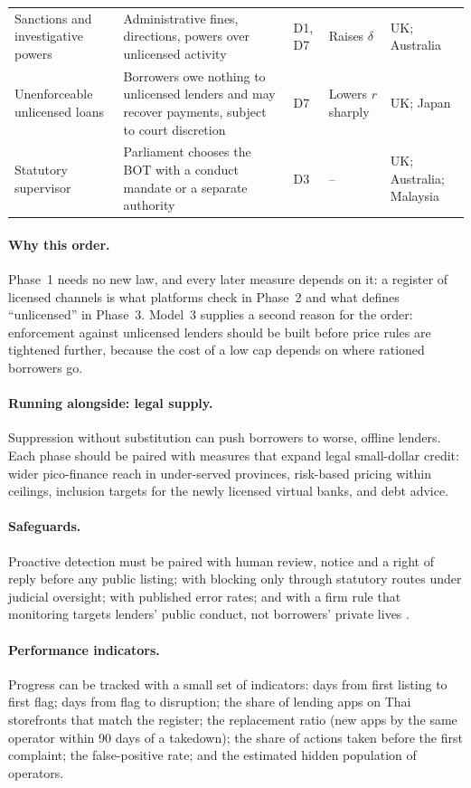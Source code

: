 \documentclass[11pt]{article}
\theoremstyle{plain}
\theoremstyle{definition}
\theoremstyle{remark}
\begin{document}
\begin{table}[htbp]
\begin{tabularx}{\textwidth}{P{3.3cm}LP{1.2cm}P{2.0cm}P{2.3cm}}
Sanctions and investigative powers & Administrative fines, directions, powers over unlicensed activity & D1, D7 & Raises $\delta$ & UK; Australia \\
Unenforceable unlicensed loans & Borrowers owe nothing to unlicensed lenders and may recover payments, subject to court discretion & D7 & Lowers $r$ sharply & UK; Japan \\
Statutory supervisor & Parliament chooses the BOT with a conduct mandate or a separate authority & D3 & -- & UK; Australia; Malaysia \\
\bottomrule
\end{tabularx}
\end{table}

\paragraph{Why this order.} Phase~1 needs no new law, and every later measure depends on it: a register of licensed channels is what platforms check in Phase~2 and what defines ``unlicensed'' in Phase~3. Model~3 supplies a second reason for the order: enforcement against unlicensed lenders should be built before price rules are tightened further, because the cost of a low cap depends on where rationed borrowers go.

\paragraph{Running alongside: legal supply.} Suppression without substitution can push borrowers to worse, offline lenders. Each phase should be paired with measures that expand legal small-dollar credit: wider pico-finance reach in under-served provinces, risk-based pricing within ceilings, inclusion targets for the newly licensed virtual banks, and debt advice.

\paragraph{Safeguards.} Proactive detection must be paired with human review, notice and a right of reply before any public listing; with blocking only through statutory routes under judicial oversight; with published error rates; and with a firm rule that monitoring targets lenders' public conduct, not borrowers' private lives \citep{AyresBraithwaite1992,BaldwinBlack2008}.

\paragraph{Performance indicators.} Progress can be tracked with a small set of indicators: days from first listing to first flag; days from flag to disruption; the share of lending apps on Thai storefronts that match the register; the replacement ratio (new apps by the same operator within 90 days of a takedown); the share of actions taken before the first complaint; the false-positive rate; and the estimated hidden population of operators.
\end{document}
